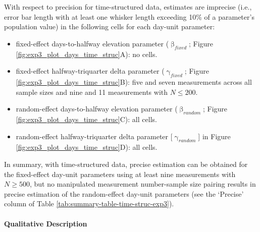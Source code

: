 \documentclass[
12pt, %
twoside,
english]{guelphthesis}
\begin{document}
With respect to precision for time-structured data, estimates are imprecise (i.e., error bar length with at least one whisker length exceeding 10\% of a parameter's population value) in the following cells for each day-unit parameter:
\begin{itemize}
\tightlist
\item
  fixed-effect days-to-halfway elevation parameter (\(\upbeta_{fixed}\); Figure \ref{fig:exp3_plot_days_time_struc}A): no cells.
\item
  fixed-effect halfway-triquarter delta parameter (\(\upgamma_{fixed}\); Figure \ref{fig:exp3_plot_days_time_struc}B): five and seven measurements across all sample sizes and nine and 11 measurements with \(N \le 200\).
\item
  random-effect days-to-halfway elevation parameter (\(\upbeta_{random}\); Figure \ref{fig:exp3_plot_days_time_struc}C): all cells.
\item
  random-effect halfway-triquarter delta parameter {[}\(\upgamma_{random}\){]} in Figure \ref{fig:exp3_plot_days_time_struc}D): all cells.
\end{itemize}
In summary, with time-structured data, precise estimation can be obtained for the fixed-effect day-unit parameters using at least nine measurements with \(N \ge 500\), but no manipulated measurement number-sample size pairing results in precise estimation of the random-effect day-unit parameters (see the `Precise' column of Table \ref{tab:summary-table-time-struc-exp3}).

\hypertarget{qualitative-time-struc-exp3}{%
\paragraph{Qualitative Description}\label{qualitative-time-struc-exp3}}
\end{document}
